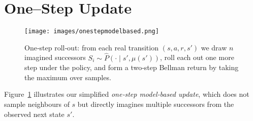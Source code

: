 \documentclass[11pt,a4paper]{report}
\begin{document}
\section{One–Step Update}
\label{sec:one_step_mbu}

\begin{figure}[htbp]
  \centering
  \texttt{[image: images/onestepmodelbased.png]}
  \caption{One‐step roll‐out: from each real transition \((s,a,r,s')\) we draw \(n\) imagined successors \(S_i\sim\hat P(\cdot\mid s',\mu(s'))\), roll each out one more step under the policy, and form a two‐step Bellman return by taking the maximum over samples.}
  \label{fig:one_step_diag}
\end{figure}

Figure~\ref{fig:one_step_diag} illustrates our simplified \emph{one‐step model‐based update}, which does not sample neighbours of \(s\) but directly imagines multiple successors from the observed next state \(s'\).
\end{document}
